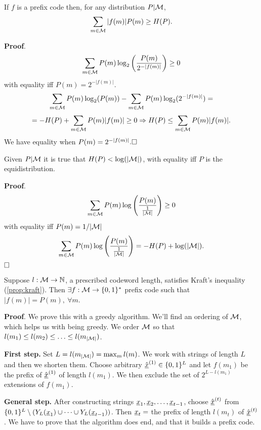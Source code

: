 \begin{prop}
	If $f$ is a prefix code then, for any distribution $P|\mathcal{M}$, $$\sum_{m\in\mathcal{M}}|f(m)|P(m) \geq H(P).$$
\end{prop}

\noindent\textbf{Proof}.
\[
\sum_{m \in\mathcal{M}}P(m) \log_2\left(\dfrac{P(m)}{2^{-|f(m)|}}\right) \geq 0
\]
with equality iff $P(m) = 2^{-|f(m)|}$.
\[
\sum_{m\in\mathcal{M}}P(m)\log_2(P(m)) - \sum_{m\in\mathcal{M}}P(m)\log_2(2^{-|f(m)|}) =
\]
\[
= -H(P) + \sum_{m\in\mathcal{M}}P(m)|f(m)| \geq 0 \Rightarrow H(P) \leq \sum_{m\in\mathcal{M}}P(m)|f(m)|.
\]
We have equality when $P(m) = 2^{-|f(m)|}.\hfill\Box$

\begin{obs}
	Given $P|\mathcal{M}$ it is true that $H(P) < \log(|\mathcal{M}|)$, with equality iff $P$ is the equidistribution.
\end{obs}

\noindent\textbf{Proof}.
\[
\sum_{m\in\mathcal{M}}P(m)\log\left(\dfrac{P(m)}{\frac{1}{|\mathcal{M}|}} \right) \geq 0
\]
with equality iff $P(m) = {1}/{|\mathcal{M}|}$
\[
\sum_{m\in\mathcal{M}}P(m)\log\left(\dfrac{P(m)}{\frac{1}{|\mathcal{M}|}} \right) = -H(P)+\log(|\mathcal{M}|).
\]
$\hfill\Box$

\begin{thm}[Kraft]
	Suppose $l:\mathcal{M} \rightarrow \mathbb{N}$, a prescribed codeword length, satisfies Kraft's inequality (\ref{prop:kraft}). Then 
	$\exists f:\mathcal{M} \rightarrow \{0, 1\}^*$ prefix code such that $|f(m)| = P(m),\ \forall m$.
\end{thm}

\noindent\textbf{Proof}. We prove this with a greedy algorithm. We'll find an ordering of $\mathcal{M}$, which helps us with being greedy. We order $\mathcal{M}$ so that $l(m_1) \leq l(m_2) \leq \ldots \leq l(m_{|\mathcal{M}|})$.

\noindent\textbf{First step.} Set $L = l(m_{|\mathcal{M}|}) = \max_ml(m)$. We work with strings of length $L$ and then we shorten them. Choose arbitrary $\hat{\underline{x}}^{(1)} \in \{0, 1\}^L$ and let $f(m_1)$ be the prefix of $\hat{\underline{x}}^{(1)}$ of length $l(m_1)$. We then exclude the set of $2^{L - l(m_1)}$ extensions of $f(m_1)$.

\noindent\textbf{General step.} After constructing strings $\underline{x}_1,\underline{x}_2, \ldots, \underline{x}_{t-1}$, choose $\hat{\underline{x}}^{(t)}$ from $\{0, 1\}^L \setminus (Y_L(\underline{x}_1) \cup \cdots \cup Y_L(\underline{x}_{t-1}))$. Then $\underline{x}_t = $ the prefix of length $l(m_t)$ of $\hat{\underline{x}}^{(t)}$. We have to prove that the algorithm does end, and that it builds a prefix code.


